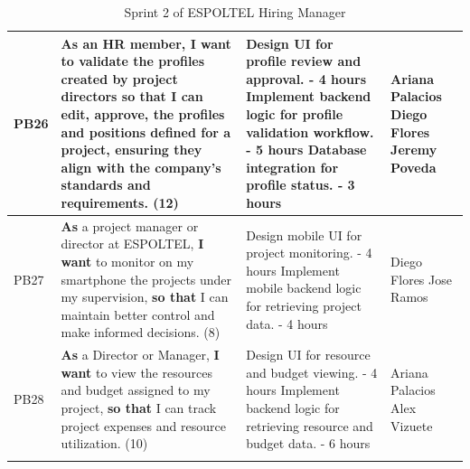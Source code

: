 \documentclass{scrreprt}
\begin{document}
\begin{longtable}{|p{1.5cm}|p{5.5cm}|p{4.5cm}|p{3cm}|}
	PB26 & \textbf{As} an HR member, \textbf{I want} to validate the profiles created by project directors \textbf{so that} I can edit, approve, the profiles and positions defined for a project, ensuring they align with the company's standards and requirements. (12) &
	
	Design UI for profile review and approval. - 4 hours \newline
	Implement backend logic for profile validation workflow. - 5 hours \newline
	Database integration for profile status. - 3 hours &
	Ariana Palacios \newline
	Diego Flores \newline
	Jeremy Poveda \\ \hline
	
	PB27 & \textbf{As} a project manager or director at ESPOLTEL, \textbf{I want} to monitor on my smartphone the projects under my supervision, \textbf{so that} I can maintain better control and make informed decisions. (8) &
	Design mobile UI for project monitoring. - 4 hours \newline
	Implement mobile backend logic for retrieving project data. - 4 hours &
	Diego Flores \newline
	Jose Ramos \\ \hline
	
	PB28 & \textbf{As} a Director or Manager, \textbf{I want} to view the resources and budget assigned to my project, \textbf{so that} I can track project expenses and resource utilization. (10) &
	Design UI for resource and budget viewing. - 4 hours \newline
	Implement backend logic for retrieving resource and budget data. - 6 hours &
	Ariana Palacios \newline
	Alex Vizuete \\ \hline
	
	\caption{Sprint 2 of ESPOLTEL Hiring Manager}
\end{longtable}
\end{document}
